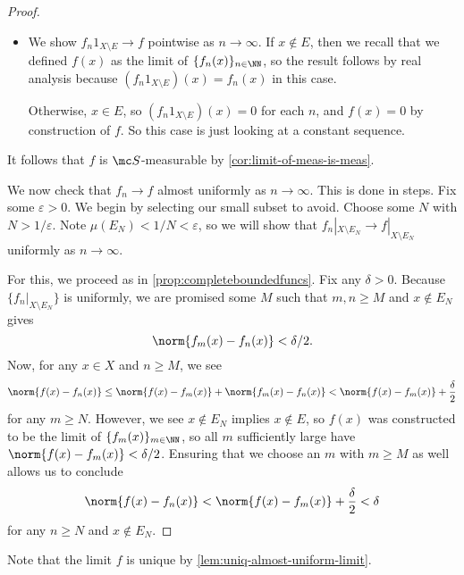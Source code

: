 \documentclass[../notes.tex]{subfiles}
\begin{document}
\begin{proof}
\begin{itemize}
		\item We show $f_n1_{X\setminus E}\to f$ pointwise as $n\to\infty$. If $x\notin E$, then we recall that we defined $f(x)$ as the limit of $\{f_n(x)\}_{n\in\NN}$, so the result follows by real analysis because $(f_n1_{X\setminus E})(x)=f_n(x)$ in this case.
		
		Otherwise, $x\in E$, so $(f_n1_{X\setminus E})(x)=0$ for each $n$, and $f(x)=0$ by construction of $f$. So this case is just looking at a constant sequence.
	\end{itemize}
	It follows that $f$ is $\mc S$-measurable by \autoref{cor:limit-of-meas-is-meas}.

	We now check that $f_n\to f$ almost uniformly as $n\to\infty$. This is done in steps. Fix some $\varepsilon>0$. We begin by selecting our small subset to avoid. Choose some $N$ with $N>1/\varepsilon$. Note $\mu(E_N)<1/N<\varepsilon$, so we will show that $f_n|_{X\setminus E_N}\to f|_{X\setminus E_N}$ uniformly as $n\to\infty$.

	For this, we proceed as in \autoref{prop:completeboundedfuncs}. Fix any $\delta>0$. Because $\{f_n|_{X\setminus E_N}\}$ is uniformly, we are promised some $M$ such that $m,n\ge M$ and $x\notin E_N$ gives
	\[\norm{f_m(x)-f_n(x)}<\delta/2.\]
	Now, for any $x\in X$ and $n\ge M$, we see
	\[\norm{f(x)-f_n(x)}\le\norm{f(x)-f_m(x)}+\norm{f_m(x)-f_n(x)}<\norm{f(x)-f_m(x)}+\frac\delta2\]
	for any $m\ge N$. However, we see $x\notin E_N$ implies $x\notin E$, so $f(x)$ was constructed to be the limit of $\{f_m(x)\}_{m\in\NN}$, so all $m$ sufficiently large have $\norm{f(x)-f_m(x)}<\delta/2$. Ensuring that we choose an $m$ with $m\ge M$ as well allows us to conclude
	\[\norm{f(x)-f_n(x)}<\norm{f(x)-f_m(x)}+\frac\delta2<\delta\]
	for any $n\ge N$ and $x\notin E_N$.
\end{proof}
\begin{remark}
	Note that the limit $f$ is unique by \autoref{lem:uniq-almost-uniform-limit}.
\end{remark}
\end{document}
